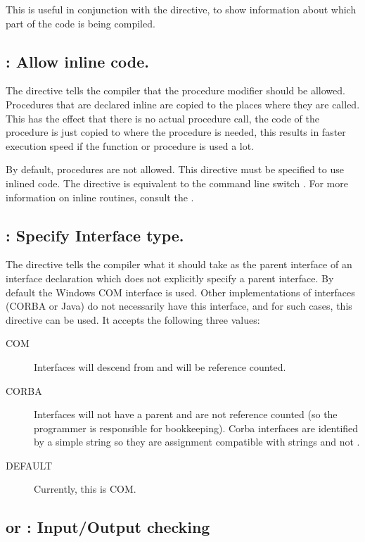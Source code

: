 This is useful in conjunction with the  directive, to show
information about which part of the code is being compiled.

\subsection{ : Allow inline code.}

The  directive tells the compiler that the 
procedure modifier should be allowed. Procedures that are declared inline
are copied to the places where they are called. This has the effect that
there is no actual procedure call, the code of the procedure is just copied
to where the procedure is needed, this results in faster execution speed if
the function or procedure is used a lot.

By default,  procedures are not allowed. This directive must be 
specified to use inlined code. The directive is equivalent to the command line
 switch . For more information on inline routines, consult the .

\subsection{ : Specify Interface type.}
The  directive tells the compiler what it should take
as the parent interface of an interface declaration which does not
explicitly specify a parent interface. By default the Windows COM 
interface is used. Other implementations of interfaces (CORBA or Java) do
not necessarily have this interface, and for such cases, this directive can
be used. It accepts the following three values:
\begin{description}
\item[COM] Interfaces will descend from  and will be reference
counted.
\item[CORBA] Interfaces will not have a parent and are not reference
counted (so the programmer is responsible for bookkeeping). 
Corba interfaces are identified by a simple string so they are assignment compatible 
with strings and not .
\item[DEFAULT] Currently, this is COM.
\end{description}

\subsection{ or  : Input/Output checking}

